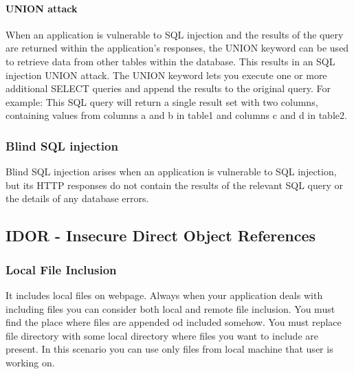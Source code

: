 \paragraph{UNION attack}
When an application is vulnerable to SQL injection and the results of the query are returned within the application's responses, the UNION keyword can be used to retrieve data from other tables within the database.
This results in an SQL injection UNION attack.
The UNION keyword lets you execute one or more additional SELECT queries and append the results to the original query.
For example: 
This SQL query will return a single result set with two columns, containing values from columns a and b in table1 and columns c and d in table2.
\subsubsection{Blind SQL injection}
Blind SQL injection arises when an application is vulnerable to SQL injection, but its HTTP responses do not contain the results of the relevant SQL query or the details of any database errors.

\subsection{IDOR - Insecure Direct Object References}

\subsubsection{Local File Inclusion} It includes local files on webpage.
Always when your application deals with including files you can consider both local and remote file inclusion.
You must find the place where files are appended od included somehow.
You must replace file directory with some local directory where files you want to include are present.
In this scenario you can use only files from local machine that user is working on.

